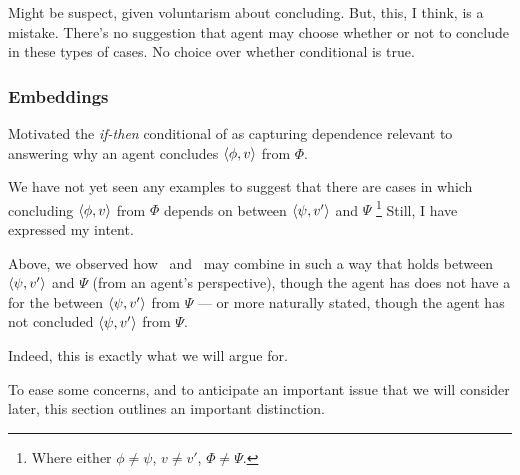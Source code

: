 \begin{note}
  Might be suspect, given voluntarism about concluding.
  But, this, I think, is a mistake.
  There's no suggestion that agent may choose whether or not to conclude in these types of cases.
  No choice over whether conditional is true.
\end{note}

\subsubsection{Embeddings}
\label{sec:embeddings}


\begin{note}
  Motivated the \emph{if-then} conditional of \qWhyV{} as capturing dependence relevant to answering why an agent concludes \(\langle \phi, v \rangle\) from \(\Phi\).

  We have not yet seen any examples to suggest that there are cases in which concluding \(\langle \phi, v \rangle\) from \(\Phi\) depends on \ros{} between \(\langle \psi, v' \rangle\) and \(\Psi\)%
  \footnote{
    Where either \(\phi \ne \psi\), \(v \ne v'\), \(\Phi \ne \Psi\).
  }
  Still, I have expressed my intent.

  Above, we observed how~\supportI{} and~\supportII{} may combine in such a way that \support{} holds between \(\langle \psi, v' \rangle\) and \(\Psi\) (from an agent's perspective), though the agent has does not have a  for the  between \(\langle \psi, v' \rangle\) from \(\Psi\) --- or more naturally stated, though the agent has not concluded \(\langle \psi, v' \rangle\) from \(\Psi\).

  Indeed, this is exactly what we will argue for.

  To ease some concerns, and to anticipate an important issue that we will consider later, this section outlines an important distinction.
\end{note}

